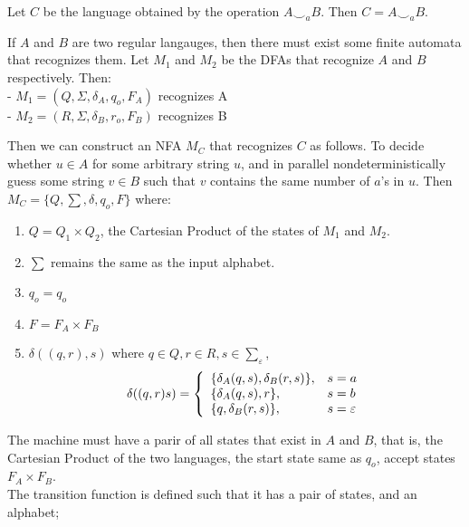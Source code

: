 \documentclass[addpoints]{exam}
\begin{document}
\begin{questions}
\begin{solution}
	Let $ C $ be the language obtained by the operation $ A\smile_a B $. Then $ C = A \smile_a B$.

	If $A$ and $B$ are two regular langauges, then there must exist some finite automata that recognizes them. Let $M_1$ and $M_2$ be the DFAs that recognize $A$ and $B$ respectively. Then: \\
	\hspace*{5mm} - $M_1 = (Q, \Sigma, \delta_A, q_o, F_A)$ recognizes A \\
	\hspace*{5mm} - $M_2 = (R, \Sigma, \delta_B, r_o, F_B)$ recognizes B 
	
	Then we can construct an NFA $M_C$ that recognizes $C$ as follows. To decide whether $ u \in A $ for some arbitrary string $u$, and in parallel nondeterministically guess some string $v \in B$ such that $v$ contains the same number of $ a $'s in $u$. Then $ M_C = \{ Q, \sum, \delta, q_o, F \} $ where: \vspace*{-2mm}
	\begin{enumerate}
		\item $ Q = Q_1 \times Q_2 $, the Cartesian Product of the states of $M_1$ and $M_2$. \vspace*{-2mm}
		\item $ \sum $ remains the same as the input alphabet. \vspace*{-2mm}
		\item $ q_o = q_o $ \vspace*{-2mm}
		\item $ F = F_A \times F_B $ \vspace*{-2mm}
		\item $\delta((q, r), s)$ where $ q \in Q, r \in R, s \in \sum_\varepsilon $,\[ 
            \delta((q, r) s) = \left\{ 
                \begin{array}{l l}
                    \{ \delta_A(q, s), \delta_B(r, s) \},& s = a \\ 
					\{ \delta_A(q, s), r \},& s = b \\
					\{ q, \delta_B(r, s) \},& s = \varepsilon \\
                \end{array}
             \right.     
        \]
	\end{enumerate} 
	The machine must have a parir of all states that exist in $A$ and $B$, that is, the Cartesian Product of the two languages, the start state same as $ q_o $, accept states $ F_A \times F_B$. \\ The transition function is defined such that it has a pair of states, and an alphabet; \vspace*{-2mm}\begin{enumerate}

\end{enumerate}
\end{solution}
\end{questions}
\end{document}
